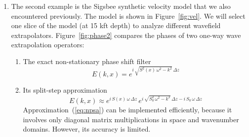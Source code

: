 \begin{enumerate}




{\small
  }

\item The second example is the Sigsbee synthetic velocity model that
  we also encountered previously. The model is shown in
  Figure~\ref{fig:vel}. We will select one slice of the model (at 15
  kft depth) to analyze different wavefield
  extrapolators. Figure~\ref{fig:phase2} compares the phases of two one-way wave
  extrapolation operators:
  \begin{enumerate}
  \item The exact non-stationary phase shift filter
    \begin{equation}
      \label{eq:nps}
      E(k,x) = e^{i\,\sqrt{S^2(x)\,\omega^2 - k^2}\,\Delta z}
    \end{equation}
  \item Its split-step approximation
    \begin{equation}
      \label{eq:npsa}
      E(k,x) \approx e^{i\,S(x)\,\omega\,\Delta z}\,e^{i\,\sqrt{S_0^2\,\omega^2 - k^2}\,\Delta z-i\,S_0\,\omega\,\Delta z}
    \end{equation}
    Approximation~(\ref{eq:npsa}) can be implemented efficiently, because it involves
    only diagonal matrix multiplications in space and wavenumber domains. However, its accuracy is limited.
  \end{enumerate}   
  

\end{enumerate}
